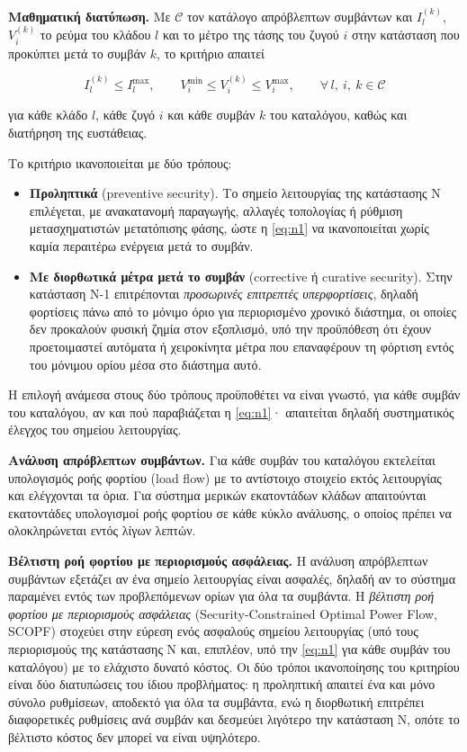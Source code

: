 \textbf{Μαθηματική διατύπωση.} Με $\mathcal{C}$ τον κατάλογο απρόβλεπτων συμβάντων και
$I_l^{(k)}$, $V_i^{(k)}$ το ρεύμα του κλάδου $l$ και το μέτρο της τάσης του ζυγού $i$ στην
κατάσταση που προκύπτει μετά το συμβάν $k$, το κριτήριο απαιτεί

\begin{equation}
I_l^{(k)} \le I_l^{\max}, \qquad V_i^{\min} \le V_i^{(k)} \le V_i^{\max},
\qquad \forall\, l,\ i,\ k \in \mathcal{C}
\label{eq:n1}
\end{equation}

για κάθε κλάδο $l$, κάθε ζυγό $i$ και κάθε συμβάν $k$ του καταλόγου, καθώς και διατήρηση της
ευστάθειας.

Το κριτήριο ικανοποιείται με δύο τρόπους:

\begin{itemize}
\item \textbf{Προληπτικά} (preventive security). Το σημείο λειτουργίας της κατάστασης N
      επιλέγεται, με ανακατανομή παραγωγής, αλλαγές τοπολογίας ή ρύθμιση μετασχηματιστών
      μετατόπισης φάσης, ώστε η \eqref{eq:n1} να ικανοποιείται χωρίς καμία περαιτέρω ενέργεια
      μετά το συμβάν. 
\item \textbf{Με διορθωτικά μέτρα μετά το συμβάν} (corrective ή curative security). Στην
      κατάσταση N-1 επιτρέπονται \emph{προσωρινές επιτρεπτές υπερφορτίσεις}, δηλαδή φορτίσεις
      πάνω από το μόνιμο όριο για περιορισμένο χρονικό διάστημα, οι οποίες δεν προκαλούν φυσική
      ζημία στον εξοπλισμό, υπό την προϋπόθεση ότι έχουν προετοιμαστεί αυτόματα ή χειροκίνητα
      μέτρα που επαναφέρουν τη φόρτιση εντός του μόνιμου ορίου μέσα στο διάστημα αυτό.
\end{itemize}

Η επιλογή ανάμεσα στους δύο τρόπους προϋποθέτει να είναι γνωστό, για κάθε συμβάν του
καταλόγου, αν και πού παραβιάζεται η \eqref{eq:n1}· απαιτείται δηλαδή συστηματικός έλεγχος του
σημείου λειτουργίας.

\textbf{Ανάλυση απρόβλεπτων συμβάντων.} Για κάθε
συμβάν του καταλόγου εκτελείται υπολογισμός ροής φορτίου (load flow) με το αντίστοιχο
στοιχείο εκτός λειτουργίας και ελέγχονται τα όρια. Για σύστημα μερικών εκατοντάδων κλάδων
απαιτούνται εκατοντάδες υπολογισμοί ροής φορτίου σε κάθε κύκλο ανάλυσης, ο οποίος πρέπει να
ολοκληρώνεται εντός λίγων λεπτών.


\textbf{Βέλτιστη ροή φορτίου με περιορισμούς ασφάλειας.} Η ανάλυση απρόβλεπτων συμβάντων εξετάζει
αν ένα σημείο λειτουργίας είναι ασφαλές, δηλαδή αν το σύστημα παραμένει εντός των προβλεπόμενων ορίων για όλα τα συμβάντα. Η \emph{βέλτιστη ροή φορτίου με περιορισμούς ασφάλειας} (Security-Constrained Optimal Power
Flow, SCOPF) στοχεύει στην εύρεση ενός ασφαλούς σημείου λειτουργίας (υπό τους περιορισμούς της κατάστασης N
και, επιπλέον, υπό την \eqref{eq:n1} για κάθε συμβάν του καταλόγου) με το ελάχιστο δυνατό κόστος. Οι δύο τρόποι ικανοποίησης
του κριτηρίου είναι δύο διατυπώσεις του ίδιου προβλήματος: η προληπτική απαιτεί ένα και μόνο
σύνολο ρυθμίσεων, αποδεκτό για όλα τα συμβάντα, ενώ η διορθωτική επιτρέπει διαφορετικές
ρυθμίσεις ανά συμβάν και δεσμεύει λιγότερο την κατάσταση N, οπότε το βέλτιστο κόστος δεν μπορεί
να είναι υψηλότερο. 


